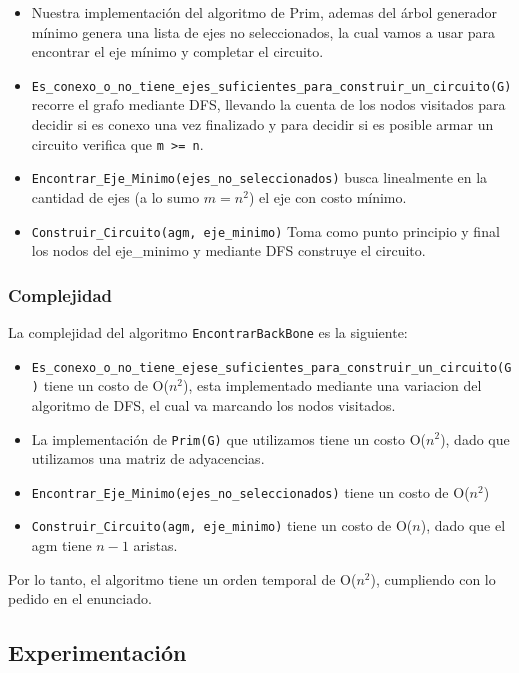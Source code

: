 \begin{itemize}
	\item Nuestra implementación del algoritmo de Prim, ademas del árbol generador mínimo genera una lista de ejes no seleccionados, la cual vamos a usar para encontrar el eje mínimo y completar el circuito.
	\item \verb+Es_conexo_o_no_tiene_ejes_suficientes_para_construir_un_circuito(G)+ recorre el grafo mediante DFS, llevando la cuenta de los nodos visitados para decidir si es conexo una vez finalizado y para decidir si es posible armar un circuito verifica que \verb+m >= n+.
	\item \verb+Encontrar_Eje_Minimo(ejes_no_seleccionados)+ busca linealmente en la cantidad de ejes (a lo sumo $m = n^2$) el eje con costo mínimo.
	\item \verb+Construir_Circuito(agm, eje_minimo)+ Toma como punto principio y final los nodos del eje_minimo y mediante DFS construye el circuito.
\end{itemize}

\subsubsection{Complejidad}

La complejidad del algoritmo \verb+EncontrarBackBone+  es la siguiente: 

\begin{itemize}
	\item \verb+Es_conexo_o_no_tiene_ejese_suficientes_para_construir_un_circuito(G)+ tiene un costo de O($n^2$), esta implementado mediante una variacion del algoritmo de DFS, el cual va marcando los nodos visitados.
	\item La implementación de \verb+Prim(G)+ que utilizamos tiene un costo O($n^2$), dado que utilizamos una matriz de adyacencias.
	\item \verb+Encontrar_Eje_Minimo(ejes_no_seleccionados)+ tiene un costo de O($n^2$)
	\item \verb+Construir_Circuito(agm, eje_minimo)+ tiene un costo de O($n$), dado que el agm tiene $n-1$ aristas.
\end{itemize}

Por lo tanto, el algoritmo tiene un orden temporal de O($n^2$), cumpliendo con lo pedido en el enunciado.

\subsection{Experimentación}

